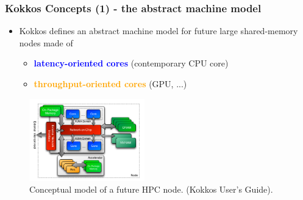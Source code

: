 \begin{frame}
  \frametitle{Kokkos Concepts (1) - the abstract machine model}

  \begin{itemize}
  \item Kokkos defines an abstract machine model for future large shared-memory nodes made of 
    \begin{itemize}
    \item \textcolor{blue}{\textbf{latency-oriented cores}} (contemporary CPU core)
    \item \textcolor{orange}{\textbf{throughput-oriented cores}} (GPU, ...)
    \end{itemize}
  \end{itemize}

  \begin{center}
    \begin{figure}
      \includegraphics[width=5cm]{images/kokkos_machine_model}
      \caption{Conceptual model of a future HPC node. (Kokkos User's Guide).}
      \end{figure}
  \end{center}

\end{frame}


